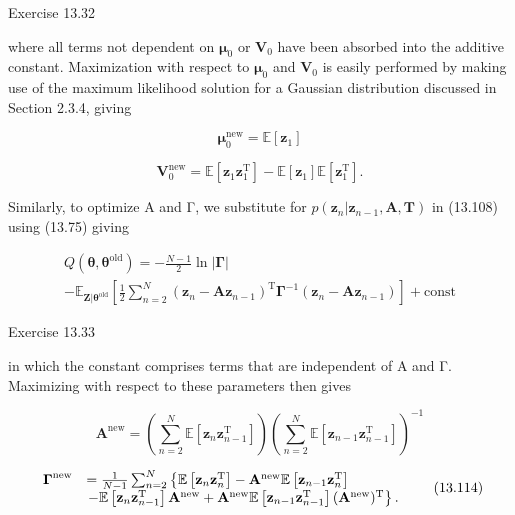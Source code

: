 \documentclass[
  10
]{article}
\begin{document}
Exercise 13.32

where all terms not dependent on \(\pmb { \mu } _ { 0 }\) or
\(\mathbf { V } _ { 0 }\) have been absorbed into the additive constant.
Maximization with respect to \(\pmb { \mu } _ { 0 }\) and
\(\mathbf { V } _ { 0 }\) is easily performed by making use of the
maximum likelihood solution for a Gaussian distribution discussed in
Section 2.3.4, giving

\[
{\pmb \mu_ {0} ^ {\mathrm{new}}} = {\mathbb {E} [ \mathbf {z} _ {1} ]}\tag{13.110}
\]

\[
{\mathbf V} _ {0} ^ {\mathrm{new}} = \mathbb {E} [ {\mathbf z} _ {1} {\mathbf z} _ {1} ^ {\mathrm{T}} ] - \mathbb {E} [ {\mathbf z} _ {1} ] \mathbb {E} [ {\mathbf z} _ {1} ^ {\mathrm{T}} ].\tag{13.111}
\]

Similarly, to optimize A and Γ, we substitute for
\(p ( \mathbf { z } _ { n } | \mathbf { z } _ { n - 1 } , \mathbf { A } , \mathbf { T } )\)
in (13.108) using (13.75) giving

\[
\begin{array}{c} Q (\pmb {\theta}, \pmb {\theta} ^ {\mathrm{old}}) = - \frac {N - 1}{2} \ln | \pmb {\Gamma} | \\ - \mathbb {E} _ {\mathbf {Z} | \pmb {\theta} ^ {\mathrm{old}}} \left[ \frac {1}{2} \sum_ {n = 2} ^ {N} (\mathbf {z} _ {n} - \mathbf {A z} _ {n - 1}) ^ {\mathrm{T}} \pmb {\Gamma} ^ {- 1} (\mathbf {z} _ {n} - \mathbf {A z} _ {n - 1}) \right] + \mathrm{const} \end{array}\tag{13.112}
\]

Exercise 13.33

in which the constant comprises terms that are independent of A and Γ.
Maximizing with respect to these parameters then gives

\[
\mathbf {A} ^ {\text {new}} = \left(\sum_ {n = 2} ^ {N} \mathbb {E} \left[ \mathbf {z} _ {n} \mathbf {z} _ {n - 1} ^ {\mathrm{T}} \right]\right) \left(\sum_ {n = 2} ^ {N} \mathbb {E} \left[ \mathbf {z} _ {n - 1} \mathbf {z} _ {n - 1} ^ {\mathrm{T}} \right]\right) ^ {- 1}\tag{13.113}
\]

\[
\begin{array}{r l} \boldsymbol {\Gamma} ^ {\text {new}} & = \frac {1}{N - 1} \sum_ {n = 2} ^ {N} \left\{\mathbb {E} \left[ \mathbf {z} _ {n} \mathbf {z} _ {n} ^ {\mathrm{T}} \right] - \mathbf {A} ^ {\text {new}} \mathbb {E} \left[ \mathbf {z} _ {n - 1} \mathbf {z} _ {n} ^ {\mathrm{T}} \right] \right. \\ & \left. - \mathbb {E} \left[ \mathbf {z} _ {n} \mathbf {z} _ {n - 1} ^ {\mathrm{T}} \right] \mathbf {A} ^ {\text {new}} + \mathbf {A} ^ {\text {new}} \mathbb {E} \left[ \mathbf {z} _ {n - 1} \mathbf {z} _ {n - 1} ^ {\mathrm{T}} \right] (\mathbf {A} ^ {\text {new}}) ^ {\mathrm{T}} \right\}. \end{array}\tag{13.114}
\]
\end{document}
